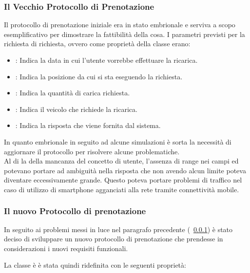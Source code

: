 \subsubsection{Il Vecchio Protocollo di Prenotazione}\label{subsubsec:old-proto}

Il protocollo di prenotazione iniziale era in stato embrionale e serviva a scopo esemplificativo per dimostrare la fattibilità della cosa. I parametri previsti per la richiesta di richiesta, ovvero come proprietà della classe  erano:

\begin{itemize}
	\item {}: Indica la data in cui l'utente vorrebbe effettuare la ricarica.
	\item {}: Indica la posizione da cui si sta eseguendo la richiesta.
	\item {}: Indica la quantità di carica richiesta. 
	\item {}: Indica il veicolo che richiede la ricarica.
	\item {}: Indica la risposta che viene fornita dal sistema.
\end{itemize}

\noindent
In quanto embrionale in seguito ad alcune simulazioni è sorta la necessità di aggiornare il protocollo per risolvere alcune problematiche. \\ 
Al di la della mancanza del concetto di utente, l'assenza di range nei campi  ed  potevano portare ad ambiguità nella risposta che non avendo alcun limite poteva diventare eccessivamente grande. Questo poteva portare problemi di traffico nel caso di utilizzo di smartphone agganciati alla rete tramite connettività mobile.

\subsubsection{Il nuovo Protocollo di prenotazione}\label{subsubsec:chargerequest}

In seguito ai problemi messi in luce nel paragrafo precedente (~\ref{subsubsec:old-proto}) è stato deciso di sviluppare un nuovo protocollo di prenotazione che prendesse in considerazioni i nuovi requisiti funzionali.

La classe è  è stata quindi ridefinita con le seguenti proprietà:

